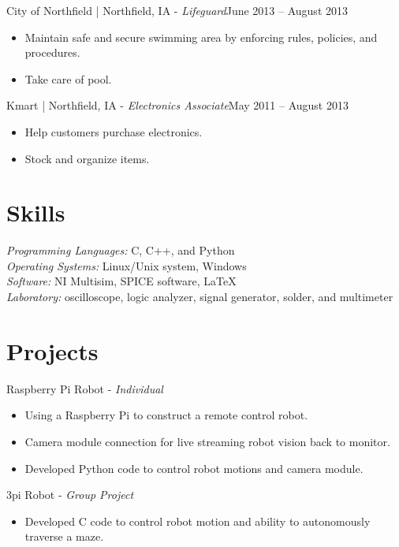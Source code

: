 \documentclass[letter]{res}
\begin{document}
\begin{resume}
 City of Northfield | Northfield, IA \newline - {\sl Lifeguard}\hfill  June 2013 – August 2013\\
  \vspace{-2mm}
 \begin{itemize}
 \item Maintain safe and secure swimming area by enforcing rules, policies, and procedures.
 \item Take care of pool.
 \end{itemize}
  \vspace{-2mm}
 
 Kmart | Northfield, IA \newline - {\sl Electronics Associate}\hfill May 2011 – August 2013\\
 \vspace{-2mm}
 \begin{itemize}
 \item Help customers purchase electronics.
 \item Stock and organize items.
 \end{itemize}
  \vspace{-2mm}
 
\section{Skills}
{\sl Programming Languages:}  C, C++, and Python\\
{\sl Operating Systems:} Linux/Unix system, Windows \\ 
{\sl Software:} NI Multisim, SPICE software,  \LaTeX \\ 
{\sl Laboratory:}  oscilloscope, logic analyzer, signal generator, solder, and multimeter \\
 \vspace{-2mm}

\section{Projects}
Raspberry Pi Robot \newline - {\sl Individual} \\
\begin{itemize}
  \vspace{-2mm}
 \item Using a Raspberry Pi to construct a remote control robot.
 \item Camera module connection for live streaming robot vision back to monitor.
 \item Developed Python code to control robot motions and camera module.
\end{itemize}
3pi Robot \newline - {\sl Group Project}\\
\begin{itemize}
  \vspace{-2mm}
 \item Developed C code to control robot motion and ability to autonomously traverse a maze. 
 \end{itemize}


\end{resume}
\end{document}
